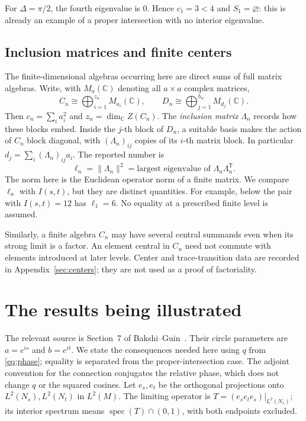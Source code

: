 \documentclass[11pt]{article}
\theoremstyle{definition}
\theoremstyle{remark}
\newcommand{\C}{\mathbb C}
\newcommand{\spec}{\operatorname{spec}}
\begin{document}
For \(\Delta=\pi/2\), the fourth eigenvalue is \(0\). Hence \(c_1=3<4\)
and \(S_1=\varnothing\): this is already an example of a proper
intersection with no interior eigenvalue.

\subsection{Inclusion matrices and finite centers}
The finite-dimensional algebras occurring here are direct sums of
full matrix algebras. Write, with \(M_a(\C)\) denoting all \(a\times a\)
complex matrices,
\[
 C_n\cong\bigoplus_{i=1}^{z_n}M_{a_i}(\C),\qquad
 D_n\cong\bigoplus_{j=1}^{h_n}M_{d_j}(\C).
\]
Then \(c_n=\sum_i a_i^2\) and \(z_n=\dim_{\C}Z(C_n)\).
The \emph{inclusion matrix} \(\Lambda_n\) records how these blocks embed.
Inside the \(j\)-th block of \(D_n\), a suitable basis makes
the action of \(C_n\) block diagonal, with \((\Lambda_n)_{ij}\)
copies of its \(i\)-th matrix block. In particular
\(d_j=\sum_i(\Lambda_n)_{ij}a_i\).
The reported number is
\begin{equation}\label{eq:ell}
 \ell_n=\|\Lambda_n\|^2
       =\text{largest eigenvalue of }\Lambda_n\Lambda_n^{\mathsf T}.
\end{equation}
The norm here is the Euclidean operator norm of a finite matrix.
We compare \(\ell_n\) with \(I(s,t)\), but they are distinct quantities.
For example, below the pair with \(I(s,t)=12\) has \(\ell_1=6\).
No equality at a prescribed finite level is assumed.

Similarly, a finite algebra \(C_n\) may have several central summands
even when its strong limit is a factor. An element central in \(C_n\)
need not commute with elements introduced at later levels.
Center and trace-transition data are recorded in
Appendix~\ref{sec:centers}; they are not used as a proof of factoriality.

\section{The results being illustrated}\label{sec:theorems}
The relevant source is Section~7 of Bakshi--Guin~\cite{BG}.
Their circle parameters are \(a=e^{is}\) and \(b=e^{it}\).
We state the consequences needed here using \(q\) from
\eqref{eq:phase}; equality is separated from the proper-intersection case.
The adjoint convention for the connection conjugates the relative phase,
which does not change \(q\) or the squared cosines.
Let \(e_s,e_t\) be the orthogonal projections onto
\(L^2(N_s),L^2(N_t)\) in \(L^2(M)\). The limiting operator is
\(T=(e_se_te_s)|_{L^2(N_s)}\); its interior spectrum means
\(\spec(T)\cap(0,1)\), with both endpoints excluded.
\end{document}
